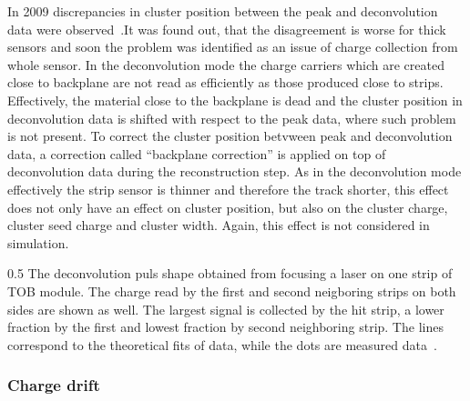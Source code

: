 In 2009 discrepancies in cluster position between the peak and deconvolution data were observed~\cite{website:backplane}.It was found out, that the disagreement is worse for thick sensors and soon the problem was identified as an issue of charge collection from whole sensor. In the deconvolution mode the charge carriers which are created close to backplane are not read as efficiently as those produced close to strips. Effectively, the material close to the backplane is dead and the cluster position in deconvolution data is shifted with respect to the peak data, where such problem is not present. To correct the cluster position betvween peak and deconvolution data, a correction called ``backplane correction'' is applied on top of deconvolution data during the reconstruction step. As in the deconvolution mode effectively the strip sensor is thinner and therefore the track shorter, this effect does not only have an effect on cluster position, but also on the cluster charge, cluster seed charge and cluster width. Again, this effect is not considered in simulation.


                 {0.5}       %
                 { The deconvolution puls shape obtained from focusing a laser on one strip of TOB module. The charge read by the first and second neigboring strips on both sides are shown as well. The largest signal is collected by the hit strip, a lower fraction by the first and lowest fraction by second neighboring strip. The lines correspond to the theoretical fits of data, while the dots are measured data~\cite{Delaere:1061284}.  }


\subsubsection{Charge drift}

